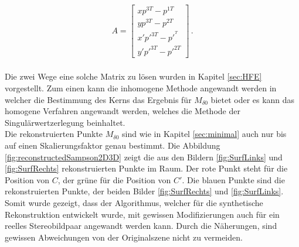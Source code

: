 
\begin{gather}
A = \begin{bmatrix}
xp^{3T}-p^{1T}\\
yp^{3T}-p^{2T}\\
x'p'^{3T}-p'^{^T}\\
y'p'^{3T}-p'^{2T}
\end{bmatrix} \, .
\end{gather}\\

Die zwei Wege eine solche Matrix zu lösen wurden in Kapitel \ref{sec:HFE} vorgestellt. Zum einen kann die inhomogene Methode angewandt werden in welcher die Bestimmung des Kerns das Ergebnis für $M_{\delta 0}$ bietet oder es kann das homogene Verfahren angewandt werden, welches die Methode der Singulärwertzerlegung beinhaltet. \\

Die rekonstruierten Punkte $M_{\delta 0}$ sind wie in Kapitel \ref{sec:minimal} auch nur bis auf einen Skalierungsfaktor genau bestimmt. Die Abbildung \ref{fig:reconstructedSampson2D3D} zeigt die aus den Bildern \ref{fig:SurfLinks} und \ref{fig:SurfRechts} rekonstruierten Punkte im Raum. Der rote Punkt steht für die Position von $C$, der grüne für die Position von $C'$. Die blauen Punkte sind die rekonstruierten Punkte, der beiden Bilder \ref{fig:SurfRechts} und \ref{fig:SurfLinks}. Somit wurde gezeigt, dass der Algorithmus, welcher für die synthetische Rekonstruktion entwickelt wurde, mit gewissen Modifizierungen auch für ein reelles Stereobildpaar angewandt werden kann. Durch die Näherungen, sind gewissen Abweichungen von der Originalszene nicht zu vermeiden.


